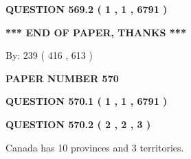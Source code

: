 \documentclass[12pt]{article}
\begin{document}
 
 
 
  
\vspace{0.2in}
  
{\textbf{\Large{QUESTION
569.2 
 ( 1 , 1 , 6791 )
}}}
  
  
   
   
 \vspace{0.2in}
 
   
   
   
   
\vspace{1.0in} 
{\textbf{\large{ *** END OF PAPER, THANKS *** }}} 
   
   
\hspace{1.0in} By: 
 239 ( 416 ,  613 )
   
   
   
   
\newpage 
\setcounter{page}{ 
   570001 } 
   
   
   
   
 {\textbf{ \Large{ PAPER NUMBER  570  }}}
   
   
\vspace{0.2in}
   
   
   
   
   
   
 \vspace{0.2in}
 
 
 
 
   
   
  
\vspace{0.2in}
  
{\textbf{\Large{QUESTION
570.1 
 ( 1 , 1 , 6791 )
}}}
  
  
  
\vspace{0.2in}
  
{\textbf{\Large{QUESTION
570.2 
 ( 2 , 2 , 3 )
}}}
  
  
 
 
\noindent{}
 
 
Canada has 10  provinces and 3 territories.
 
 
 
 
   
   
 \vspace{0.2in}
 
   
   
\end{document}
